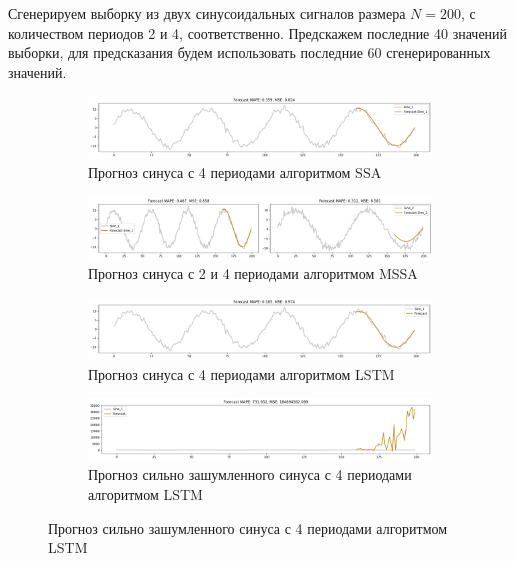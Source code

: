\documentclass{article}
\begin{document}
Сгенерируем выборку из двух синусоидальных сигналов размера $N = 200$, с количеством периодов 2 и 4, соответственно. Предскажем последние 40 значений выборки, для предсказания будем использовать последние 60 сгенерированных значений.\\

\begin{figure}[H]
    \begin{subfigure}
	\centering
	\includegraphics[width=1\textwidth]{figures/ssa_sin_low_noise.png}
	\caption{Прогноз синуса с 4 периодами алгоритмом SSA}
	\label{fig:fig2}
    \end{subfigure}

    \vspace{\baselineskip}

    \begin{subfigure}
	\centering
	\includegraphics[width=1\textwidth]{figures/mssa_2sin_low_noise.png}
	\caption{Прогноз синуса с 2 и 4 периодами алгоритмом MSSA}
	\label{fig:fig2}
    \end{subfigure}

    \vspace{\baselineskip}

    \begin{subfigure}
	\centering
	\includegraphics[width=1\textwidth]{figures/lstm_sin_low_noise.png}
	\caption{Прогноз синуса с 4 периодами алгоритмом LSTM}
	\label{fig:fig2}
    \end{subfigure}

    \vspace{\baselineskip}

    \begin{subfigure}
	\centering
	\includegraphics[width=1\textwidth]{figures/lstm_sin_high_noise.png}
	\caption{Прогноз сильно зашумленного синуса с 4 периодами алгоритмом LSTM}
	\label{fig:fig2}
    \end{subfigure}


\end{figure}
\end{document}

